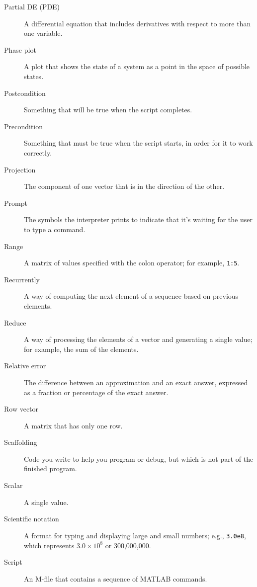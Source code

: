 \begin{description}
\item[Partial DE (PDE)] A differential equation that includes derivatives with respect to more than one variable.

\item[Phase plot] A plot that shows the state of a system as a point
in the space of possible states.

\item[Postcondition] Something that will be true when the script
completes.

\item[Precondition] Something that must be true when the script
starts, in order for it to work correctly.

\item[Projection] The component of one vector that is in the
direction of the other.

\item[Prompt] The symbols the interpreter prints to indicate that it's
waiting for the user to type a command.

\item[Range] A matrix of values specified with the colon operator; for example, \lstinline{1:5}.

\item[Recurrently] A way of computing the next element of a sequence
based on previous elements.

\item[Reduce] A way of processing the elements of a vector and
generating a single value; for example, the sum of the elements.

\item[Relative error] The difference between an approximation and
an exact answer, expressed as a fraction or percentage of the exact
answer.

\item[Row vector] A matrix that has only one row.

\item[Scaffolding] Code you write to help you program or debug, but
which is not part of the finished program.

\item[Scalar] A single value.

\item[Scientific notation] A format for typing and displaying large
and small numbers; e.g., \lstinline{3.0e8}, which represents $3.0 \times 10^8$
or 300,000,000.

\item[Script] An M-file that contains a sequence of MATLAB commands.


\end{description}
